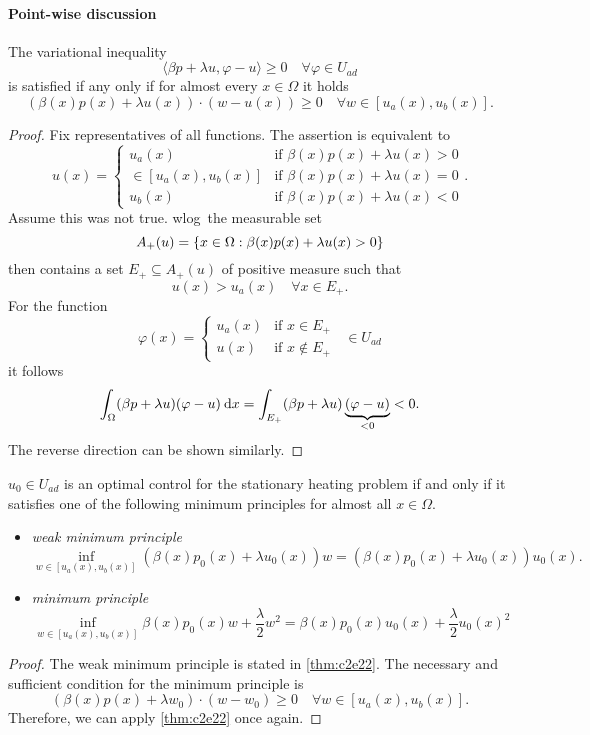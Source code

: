 \documentclass[../skript.tex]{subfiles}
\begin{document}
\paragraph{Point-wise discussion}
\begin{lemma} %
\label{thm:c2e22}
The variational inequality
\[
	\langle \beta p + \lambda u, \varphi - u \rangle \geq 0 \quad \forall \varphi \in U_{ad}
\]
is satisfied if any only if for almost every $x \in \Omega$ it holds
\[
	\left( \beta(x) p(x) + \lambda u(x) \right) \cdot \left( w - u(x) \right) \geq 0 \quad \forall w \in [u_a(x), u_b(x)].
\]
\end{lemma}
\begin{proof}
Fix representatives of all functions.
The assertion is equivalent to
\[
	u(x) = \begin{cases}
	u_a(x) & \text{if } \beta(x) p(x) + \lambda u(x) > 0 \\
	\in [u_a(x), u_b(x)] & \text{if } \beta(x) p(x) + \lambda u(x) = 0 \\
	u_b(x) & \text{if } \beta(x) p(x) + \lambda u(x) < 0
	\end{cases}.
\]
Assume this was not true. \ac{wlog}\ the measurable set
\[
	A_+(u) = \{ x \in \Omega \mathrel{}:\mathrel{} \beta(x) p(x) + \lambda u(x) > 0 \}
\]
then contains a set $E_+ \subseteq A_+(u)$ of positive measure such that 
\[
	u(x) > u_a(x) \quad \forall x \in E_+.
\]
For the function
\[
	\varphi(x) = \begin{cases}
	u_a(x) & \text{if } x \in E_+ \\
	u(x) & \text{if } x \notin E_+
	\end{cases} \;\; \in U_{ad}
\]
it follows
\[
	\int_\Omega (\beta p + \lambda u ) (\varphi -u ) \:\mathrm{d}x = \int_{E_+} (\beta p + \lambda u )\underbrace{(\varphi - u)}_{< 0} < 0.
\]
The reverse direction can be shown similarly.
\end{proof}
\begin{theorem} %
\label{thm:c2e23}
$u_0 \in U_{ad}$ is an optimal control for the stationary heating problem if and only if it satisfies one of the following minimum principles for almost all $x \in \Omega$.
\begin{itemize}
\item \emph{weak minimum principle}
\[
	\inf_{w \in [u_a(x), u_b(x)]} \left( \beta(x) p_0(x) + \lambda u_0(x) \right) w = \left( \beta(x) p_0(x) + \lambda u_0(x) \right) u_0(x).
\]
\item \emph{minimum principle}
\[
	\inf_{w \in [u_a(x), u_b(x)]} \beta(x) p_0(x) w + \frac{\lambda}{2} w^2 = \beta(x) p_0(x) u_0(x) + \frac{\lambda}{2} u_0(x)^2
\]
\end{itemize}
\end{theorem}
\begin{proof}
The weak minimum principle is stated in \cref{thm:c2e22}.
The necessary and sufficient condition for the minimum principle is
\[
	\left( \beta(x) p(x) + \lambda w_0 \right) \cdot (w - w_0) \geq 0 \quad \forall w \in [u_a(x), u_b(x)].
\]
Therefore, we can apply \cref{thm:c2e22} once again.
\end{proof}
\end{document}
